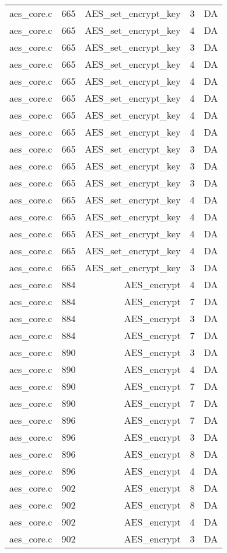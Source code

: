 \begin{table*}
\begin{tabular}{clrrr}
aes\_core.c&665&AES\_set\_encrypt\_key&3 &DA\\
aes\_core.c&665&AES\_set\_encrypt\_key&4 &DA\\
aes\_core.c&665&AES\_set\_encrypt\_key&3 &DA\\
aes\_core.c&665&AES\_set\_encrypt\_key&4 &DA\\
aes\_core.c&665&AES\_set\_encrypt\_key&4 &DA\\
aes\_core.c&665&AES\_set\_encrypt\_key&4 &DA\\
aes\_core.c&665&AES\_set\_encrypt\_key&4 &DA\\
aes\_core.c&665&AES\_set\_encrypt\_key&4 &DA\\
aes\_core.c&665&AES\_set\_encrypt\_key&3 &DA\\
aes\_core.c&665&AES\_set\_encrypt\_key&3 &DA\\
aes\_core.c&665&AES\_set\_encrypt\_key&3 &DA\\
aes\_core.c&665&AES\_set\_encrypt\_key&4 &DA\\
aes\_core.c&665&AES\_set\_encrypt\_key&4 &DA\\
aes\_core.c&665&AES\_set\_encrypt\_key&4 &DA\\
aes\_core.c&665&AES\_set\_encrypt\_key&4 &DA\\
aes\_core.c&665&AES\_set\_encrypt\_key&3 &DA\\
aes\_core.c&884&AES\_encrypt&4 &DA\\
aes\_core.c&884&AES\_encrypt&7 &DA\\
aes\_core.c&884&AES\_encrypt&3 &DA\\
aes\_core.c&884&AES\_encrypt&7 &DA\\
aes\_core.c&890&AES\_encrypt&3 &DA\\
aes\_core.c&890&AES\_encrypt&4 &DA\\
aes\_core.c&890&AES\_encrypt&7 &DA\\
aes\_core.c&890&AES\_encrypt&7 &DA\\
aes\_core.c&896&AES\_encrypt&7 &DA\\
aes\_core.c&896&AES\_encrypt&3 &DA\\
aes\_core.c&896&AES\_encrypt&8 &DA\\
aes\_core.c&896&AES\_encrypt&4 &DA\\
aes\_core.c&902&AES\_encrypt&8 &DA\\
aes\_core.c&902&AES\_encrypt&8 &DA\\
aes\_core.c&902&AES\_encrypt&4 &DA\\
aes\_core.c&902&AES\_encrypt&3 &DA\\

\end{tabular}
\end{table*}
